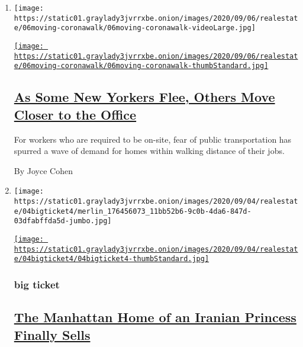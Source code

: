 \begin{enumerate}
\def\labelenumi{\arabic{enumi}.}
\item
  \texttt{[image: https://static01.graylady3jvrrxbe.onion/images/2020/09/06/realestate/06moving-coronawalk/06moving-coronawalk-videoLarge.jpg]}

  \href{/2020/09/04/realestate/nyc-office-move-closer.html}{\texttt{[image: https://static01.graylady3jvrrxbe.onion/images/2020/09/06/realestate/06moving-coronawalk/06moving-coronawalk-thumbStandard.jpg]}}

  \hypertarget{as-some-new-yorkers-flee-others-move-closer-to-the-office}{%
  \subsection{\texorpdfstring{\href{/2020/09/04/realestate/nyc-office-move-closer.html}{As
  Some New Yorkers Flee, Others Move Closer to the
  Office}}{As Some New Yorkers Flee, Others Move Closer to the Office}}\label{as-some-new-yorkers-flee-others-move-closer-to-the-office}}

  For workers who are required to be on-site, fear of public
  transportation has spurred a wave of demand for homes within walking
  distance of their jobs.

  By Joyce Cohen
\item
  \texttt{[image: https://static01.graylady3jvrrxbe.onion/images/2020/09/04/realestate/04bigticket4/merlin\_176456073\_11bb52b6-9c0b-4da6-847d-03dfabffda5d-jumbo.jpg]}

  \href{/2020/09/04/realestate/iranian-princess-townhouse-nyc-sales.html}{\texttt{[image: https://static01.graylady3jvrrxbe.onion/images/2020/09/04/realestate/04bigticket4/04bigticket4-thumbStandard.jpg]}}

  \hypertarget{big-ticket}{%
  \subsubsection{big ticket}\label{big-ticket}}

  \hypertarget{the-manhattan-home-of-an-iranian-princess-finally-sells}{%
  \subsection{\texorpdfstring{\href{/2020/09/04/realestate/iranian-princess-townhouse-nyc-sales.html}{The
  Manhattan Home of an Iranian Princess Finally
  Sells}}{The Manhattan Home of an Iranian Princess Finally Sells}}\label{the-manhattan-home-of-an-iranian-princess-finally-sells}}


\end{enumerate}
